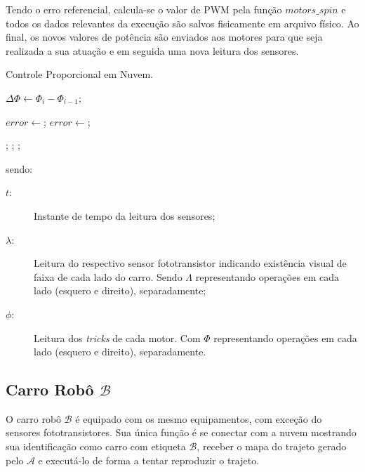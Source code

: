 		Tendo o erro referencial, calcula-se o valor de PWM pela função $motors\_spin$ e todos os dados relevantes da execução são salvos fisicamente em arquivo físico. Ao final, os novos valores de potência são enviados aos motores para que seja realizada a sua atuação e em seguida uma nova leitura dos sensores.

		\begin{algorithm}[H]
			\caption{Controle Proporcional em Nuvem.} \label{alg:nuvem}
			\begin{algorithmic}[1]
					\State $\Delta \Phi \gets \Phi_{i} - \Phi_{i-1};$      

					\If {$\Lambda$}
							\State $error \gets $;
						\Else
							\State $error \gets $;
					\EndIf

					\State {};
					\State {};
					\State {};
				\EndProcedure
			\end{algorithmic}
		\end{algorithm}

		sendo:

		\begin{description}
			\item [$t$:] Instante de tempo da leitura dos sensores;
			\item [$\lambda$:] Leitura do respectivo sensor fototransistor indicando existência visual de faixa de cada lado do carro. Sendo $\Lambda$ representando operações em cada lado (esquero e direito), separadamente;
			\item [$\phi$:] Leitura dos \textit{tricks} de cada motor. Com $\Phi$ representando operações em cada lado (esquero e direito), separadamente.
		\end{description}

	\subsection{Carro Robô $ \mathcal{B} $}
		O carro robô $ \mathcal{B} $ é equipado com os mesmo equipamentos, com exceção do sensores fototransistores. Sua única função é se conectar com a nuvem mostrando sua identificação como carro com etiqueta $ \mathcal{B} $, receber o mapa do trajeto gerado pelo $ \mathcal{A} $ e executá-lo de forma a tentar reproduzir o trajeto.

